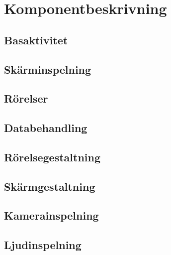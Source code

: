 \section{Komponentbeskrivning}

\subsection{Basaktivitet}


\subsection{Skärminspelning}


\subsection{Rörelser}


\subsection{Databehandling}
\label{sub:dataprocessing}


\subsection{Rörelsegestaltning}
\label{sub:touchmedia}


\subsection{Skärmgestaltning}
\label{sub:screenmedia}


\subsection{Kamerainspelning}


\subsection{Ljudinspelning}

